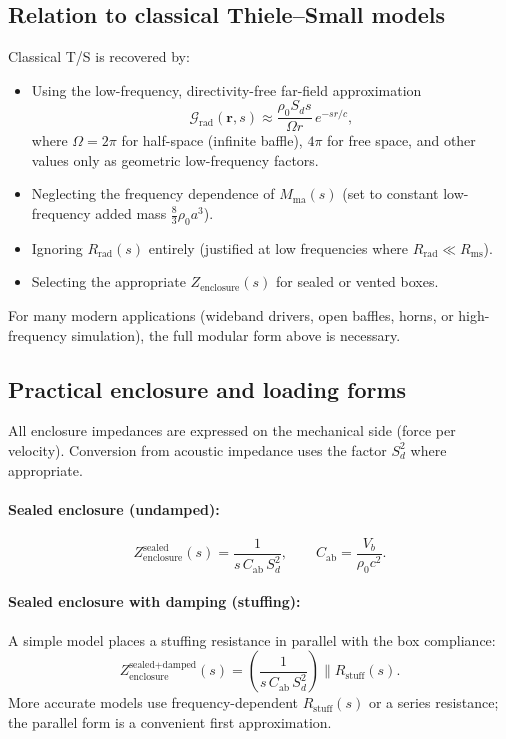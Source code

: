\subsection{Relation to classical Thiele–Small models}

Classical T/S is recovered by:
\begin{itemize}
  \item Using the low-frequency, directivity-free far-field approximation
    \[
    \mathcal{G}_{\mathrm{rad}}(\mathbf{r},s)\approx \frac{\rho_0 S_d s}{\Omega r}\,e^{-sr/c},
    \]
    where \(\Omega=2\pi\) for half-space (infinite baffle), \(4\pi\) for free space, and other values only as geometric low-frequency factors.
  \item Neglecting the frequency dependence of \(M_{\mathrm{ma}}(s)\) (set to constant low-frequency added mass \(\frac{8}{3}\rho_0 a^3\)).
  \item Ignoring \(R_{\mathrm{rad}}(s)\) entirely (justified at low frequencies where \(R_{\mathrm{rad}}\ll R_{\mathrm{ms}}\)).
  \item Selecting the appropriate \(Z_{\mathrm{enclosure}}(s)\) for sealed or vented boxes.
\end{itemize}
For many modern applications (wideband drivers, open baffles, horns, or high-frequency simulation), the full modular form above is necessary.

\subsection{Practical enclosure and loading forms}

All enclosure impedances are expressed on the mechanical side (force per velocity). Conversion from acoustic impedance uses the factor \(S_d^2\) where appropriate.

\paragraph{Sealed enclosure (undamped):}
\[
\boxed{Z_{\mathrm{enclosure}}^{\text{sealed}}(s)=\frac{1}{s\,C_{\mathrm{ab}}\,S_d^2}},\qquad
C_{\mathrm{ab}}=\frac{V_b}{\rho_0 c^2}.
\]

\paragraph{Sealed enclosure with damping (stuffing):}
A simple model places a stuffing resistance in parallel with the box compliance:
\[
\boxed{Z_{\mathrm{enclosure}}^{\text{sealed+damped}}(s)
=\left(\frac{1}{s\,C_{\mathrm{ab}}\,S_d^2}\right)\parallel R_{\mathrm{stuff}}(s)}.
\]
More accurate models use frequency-dependent \(R_{\mathrm{stuff}}(s)\) or a series resistance; the parallel form is a convenient first approximation.

